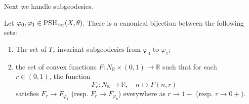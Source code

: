 Next we handle subgeodesics.
\begin{proposition}\label{prop:toricsubgeod}
    Let $\varphi_0,\varphi_1\in \mathrm{PSH}_{\mathrm{tor}}(X,\theta)$.
    There is a canonical bijection between the following sets:
    \begin{enumerate}
        \item\label{itm:prop:toricsubgeod:1} The set of $T_c$-invariant subgeodesics from $\varphi_0$ to $\varphi_1$;
        \item\label{itm:prop:toricsubgeod:2} the set of convex functions $F\colon N_{\mathbb{R}}\times (0,1)\rightarrow \mathbb{R}$ such that for each $r\in (0,1)$, the function
        \begin{equation}\label{eq:Ftdefsubgeo}
        F_r\colon N_{\mathbb{R}}\rightarrow \mathbb{R},\quad n\mapsto F(n,r)
        \end{equation}
        satisfies $F_r\to F_{\varphi_1}$ (resp. $F_r\to F_{\varphi_0}$) everywhere as $r\to 1-$ (resp. $r\to 0+$).
    \end{enumerate}
\end{proposition}

